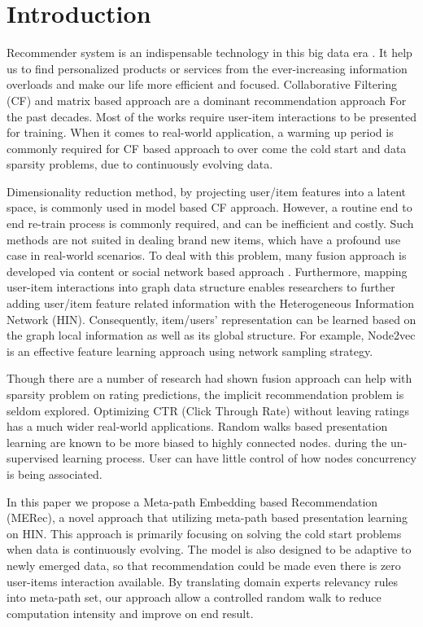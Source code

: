 \section{Introduction}

Recommender system is an indispensable technology in this big data era \cite{lu2015recommender}. It help us to find personalized products or services from the ever-increasing information overloads and make our life more efficient and focused. Collaborative Filtering (CF) and matrix based approach are a dominant recommendation approach For the past decades. Most of the works require user-item interactions to be presented for training. When it comes to real-world application, a warming up period is commonly required for CF based approach to over come the cold start and data sparsity problems, due to continuously evolving data.

Dimensionality reduction method, by projecting user/item features into a latent space, is commonly used in model based CF approach. However, a routine end to end re-train process is commonly required, and can be inefficient and costly. Such methods are not suited in dealing brand new items, which have a profound use case in real-world scenarios. To deal with this problem, many fusion approach is developed via content or social network based approach \cite{mao2016multirelational,wang2016member}. Furthermore, mapping user-item interactions into graph data structure enables researchers to further adding user/item feature related information with the Heterogeneous Information Network (HIN). Consequently, item/users' representation can be learned based on the graph local information as well as its global structure. For example, Node2vec \cite{grover2016node2vec} is an effective feature learning approach using network sampling strategy. 

Though there are a number of research had shown fusion approach can help with sparsity problem on rating predictions, the implicit recommendation problem is seldom explored. Optimizing CTR (Click Through Rate) without leaving ratings has a much wider real-world applications. Random walks based presentation learning are known to be more biased to highly connected nodes. \cite{sun2011pathsim} during the un-supervised learning process. User can have little control of how nodes concurrency is being associated. 

In this paper we propose a Meta-path Embedding based Recommendation (MERec), a novel approach that utilizing meta-path based presentation learning on HIN. This approach is primarily focusing on solving the cold start problems when data is continuously evolving. The model is also designed to be adaptive to newly emerged data, so that recommendation could be made even there is zero user-items interaction available. By translating domain experts relevancy rules into meta-path set, our approach allow a controlled random walk to reduce computation intensity and improve on end result. 

